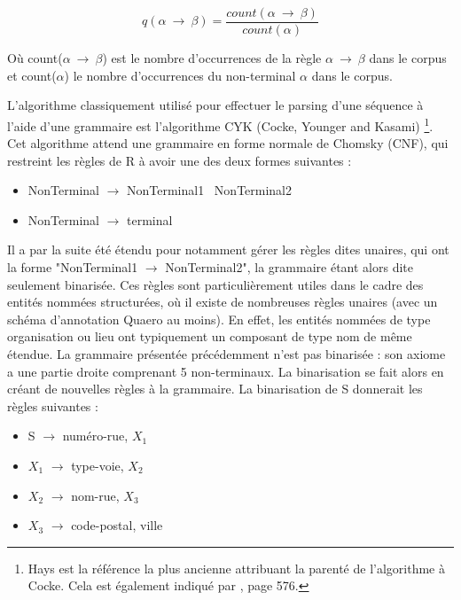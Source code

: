 \documentclass[PhD-Yoann-Dupont.tex]{subfiles}
\begin{document}
\begin{equation}
q(\alpha\ \rightarrow\ \beta) = \frac{count(\alpha\ \rightarrow\ \beta)}{count(\alpha)}
\end{equation}

Où count($\alpha\ \rightarrow\ \beta$) est le nombre d'occurrences de la règle $\alpha\ \rightarrow\ \beta$ dans le corpus et count($\alpha$) le nombre d'occurrences du non-terminal $\alpha$ dans le corpus.

L'algorithme classiquement utilisé pour effectuer le parsing d'une séquence à l'aide d'une grammaire est l'algorithme CYK (Cocke, Younger and Kasami) \citep{hays1962automatic,kasami1965efficient,younger1967recognition}\footnote{Hays est la référence la plus ancienne attribuant la parenté de l'algorithme à Cocke. Cela est également indiqué par \citet{jacobs1990parsing}, page 576.}. Cet algorithme attend une grammaire en forme normale de Chomsky (CNF), qui restreint les règles de R à avoir une des deux formes suivantes :

\begin{itemize}
    \item NonTerminal $\rightarrow$ NonTerminal1 \ NonTerminal2
    \item NonTerminal $\rightarrow$ terminal
\end{itemize}

Il a par la suite été étendu pour notamment gérer les règles dites unaires, qui ont la forme "NonTerminal1 $\rightarrow$ NonTerminal2", la grammaire étant alors dite seulement binarisée. Ces règles sont particulièrement utiles dans le cadre des entités nommées structurées, où il existe de nombreuses règles unaires (avec un schéma d'annotation Quaero au moins). En effet, les entités nommées de type organisation ou lieu ont typiquement un composant de type nom de même étendue. La grammaire présentée précédemment n'est pas binarisée : son axiome a une partie droite comprenant 5 non-terminaux. La binarisation se fait alors en créant de nouvelles règles à la grammaire. La binarisation de S donnerait les règles suivantes :
\begin{itemize}
    \item S $\rightarrow$ numéro-rue, $X_{1}$
    \item $X_{1}$ $\rightarrow$ type-voie, $X_{2}$
    \item $X_{2}$ $\rightarrow$ nom-rue, $X_{3}$
    \item $X_{3}$ $\rightarrow$ code-postal, ville
\end{itemize}
\end{document}

